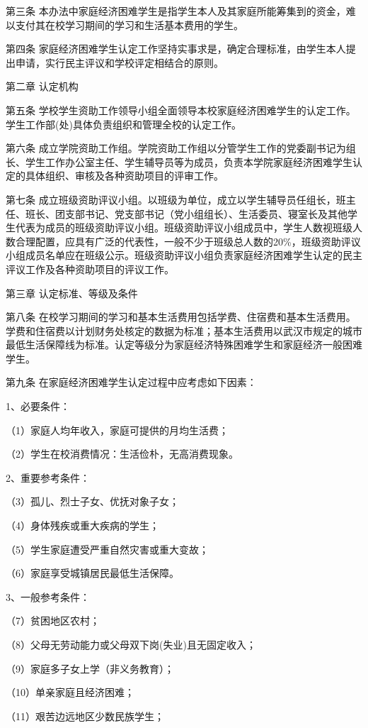 \documentclass[UTF8,12pt,a4paper]{report}
\begin{document}
第三条 本办法中家庭经济困难学生是指学生本人及其家庭所能筹集到的资金，难以支付其在校学习期间的学习和生活基本费用的学生。

第四条 家庭经济困难学生认定工作坚持实事求是，确定合理标准，由学生本人提出申请，实行民主评议和学校评定相结合的原则。

第二章 认定机构

第五条 学校学生资助工作领导小组全面领导本校家庭经济困难学生的认定工作。学生工作部(处)具体负责组织和管理全校的认定工作。

第六条 成立学院资助工作组。学院资助工作组以分管学生工作的党委副书记为组长、学生工作办公室主任、学生辅导员等为成员，负责本学院家庭经济困难学生认定的具体组织、审核及各种资助项目的评审工作。

第七条 成立班级资助评议小组。以班级为单位，成立以学生辅导员任组长，班主任、班长、团支部书记、党支部书记（党小组组长）、生活委员、寝室长及其他学生代表为成员的班级资助评议小组。班级资助评议小组成员中，学生人数视班级人数合理配置，应具有广泛的代表性，一般不少于班级总人数的20\%，班级资助评议小组成员名单应在班级公示。班级资助评议小组负责家庭经济困难学生认定的民主评议工作及各种资助项目的评议工作。

第三章 认定标准、等级及条件

第八条 在校学习期间的学习和基本生活费用包括学费、住宿费和基本生活费用。学费和住宿费以计划财务处核定的数据为标准；基本生活费用以武汉市规定的城市最低生活保障线为标准。认定等级分为家庭经济特殊困难学生和家庭经济一般困难学生。

第九条 在家庭经济困难学生认定过程中应考虑如下因素：

1、必要条件：

（1）家庭人均年收入，家庭可提供的月均生活费；

（2）学生在校消费情况：生活俭朴，无高消费现象。

2、重要参考条件：

（3）孤儿、烈士子女、优抚对象子女；

（4）身体残疾或重大疾病的学生；

（5）学生家庭遭受严重自然灾害或重大变故；

（6）家庭享受城镇居民最低生活保障。

3、一般参考条件：

（7）贫困地区农村；

（8）父母无劳动能力或父母双下岗(失业)且无固定收入；

（9）家庭多子女上学（非义务教育）；

（10）单亲家庭且经济困难；

（11）艰苦边远地区少数民族学生；
\end{document}
